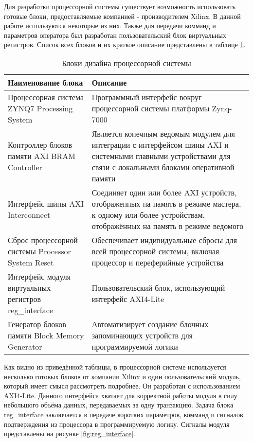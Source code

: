 Для разработки процессорной системы существует возможность использовать готовые блоки, предоставляемые компанией - производителем Xilinx. В данной работе используются некоторые из них. Также для передачи комманд и параметров оператора был разработан пользовательский блок виртуальных регистров. Список всех блоков и их краткое описание представлены в таблице \ref{tab:PS_blocks}.\par
\begin{table}[ht]
    \label{tab:PS_blocks}
    \caption{Блоки дизайна процессорной системы}
    \begin{tabular}{|p{}|p{}|}
        \hline
        Наименование блока & Описание \\
        \hline
        Процессорная система ZYNQ7 Processing System & Программный интерфейс вокруг процессорной системы платформы Zynq-7000 \\
        \hline
        Контроллер блоков памяти AXI BRAM Controller & Является конечным ведомым модулем для интеграции с интерфейсом шины AXI и системными главными устройствами для связи с локальными блоками оперативной памяти \\
        \hline
        Интерфейс шины AXI Interconnect & Соединяет один или более AXI устройств, отображенных на память в режиме мастера, к одному или более устройствам, отображённых на память в режиме ведомого \\
        \hline
        Сброс процессорной системы Processor System Reset & Обеспечивает индивидуальные сбросы для всей процессорной системы, включая процессор и переферийные устройства \\
        \hline
        Интерфейс модуля виртуальных регистров reg\_interface & Пользовательский блок, использующий интерфейс AXI4-Lite \\
        \hline
        Генератор блоков памяти Block Memory Generator & Автоматизирует создание блочных запоминающих устройств для программируемой логики\\
        \hline
    \end{tabular}
\end{table}
Как видно из приведённой таблицы, в процессорной системе используется несколько готовых блоков от компании Xilinx и один пользовательский модуль, который имеет смысл рассмотреть подробнее. Он разработан с использованием AXI4-Lite. Данного интерфейса хватает для корректной работы модуля в силу небольшого объёма данных, передаваемых за одну транзакцию. Задача блока reg\_interface заключается в передаче коротких параметров, комманд и сигналов подтверждения из процессора в программируемую логику. Сигналы модуля представлены на рисунке \ref{fig:reg_interface}.\par 
